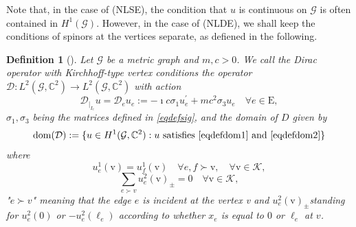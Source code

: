 \documentclass[11pt]{amsart}
\newtheorem{definition}[theorem]{Definition}
\newcommand{\G}{\mathcal{G}}
\numberwithin{equation}{section}
\begin{document}
Note that, in the case of (NLSE), the condition that $u$ is continuous on $\G$ is often contained in $H^1(\G)$. However, in the case of (NLDE), we shall keep the conditions of spinors at the vertices separate, as defiened in the following.
\begin{definition}[{\cite[Definition 2.3]{Bo}}]
\label{defD}
Let $\mathcal{G}$ be a metric graph and  $m, c>0$. We call the Dirac operator with Kirchhoff-type vertex conditions the operator $\mathcal{D}: L^2(\mathcal{G}, \mathbb{C}^2) \rightarrow L^2(\mathcal{G}, \mathbb{C}^2)$ with action
\begin{equation}\label{eqdefde}
    \mathcal{D}_{\left.\right|_{I_e}} u=\mathcal{D}_e u_e:=-\imath c \sigma_1 u_e^{\prime}+m c^2 \sigma_3 u_e \quad \forall e \in \mathrm{E},
\end{equation}
$\sigma_1, \sigma_3$ being the matrices defined in \eqref{eqdefsig}, and the domain of $D$ given by
$$
\operatorname{dom}(\mathcal{D}):=\{u \in H^1(\mathcal{G}, \mathbb{C}^2): u \text { satisfies \eqref{eqdefdom1} and \eqref{eqdefdom2}}\}
$$
where
\begin{equation}
\label{eqdefdom1}
    u_e^1(\mathrm{v})=u_f^1(\mathrm{v}) \quad \forall e, f \succ \mathrm{v}, \quad \forall \mathrm{v} \in \mathcal{K},
\end{equation}
\begin{equation}
\label{eqdefdom2}
    \sum_{e \succ v} u_e^2(\mathrm{v})_{ \pm}=0 \quad \forall \mathrm{v} \in \mathcal{K},
\end{equation}
"$e \succ v$" meaning that the edge $e$ is incident at the vertex v and $u_e^2(\mathrm{v})_{ \pm}$standing for $u_e^2(0)$ or $-u_e^2(\ell_e)$ according to whether $x_e$ is equal to $0$ or $\ell_e$ at $v$.
\end{definition}
\iffalse
\end{document}
